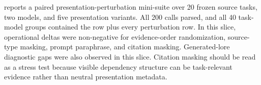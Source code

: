 

 reports a paired presentation-perturbation mini-suite over 20 frozen source tasks, two models, and five presentation variants. All 200 calls parsed, and all 40 task-model groups contained the  row plus every perturbation row. In this slice, operational deltas were non-negative for evidence-order randomization, source-type masking, prompt paraphrase, and citation masking. Generated-lore diagnostic gaps were also observed in this slice. Citation masking should be read as a stress test because visible dependency structure can be task-relevant evidence rather than neutral presentation metadata.
